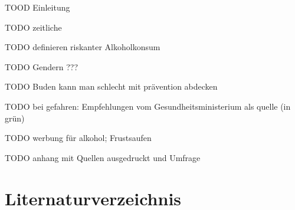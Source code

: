 \documentclass[12pt]{article}
\begin{document}
TOOD Einleitung

TODO zeitliche

TODO definieren riskanter Alkoholkonsum

TODO Gendern ???

TODO Buden kann man schlecht mit prävention abdecken


TODO bei gefahren: Empfehlungen vom Gesundheitsministerium als quelle (in grün)

TODO werbung für alkohol; Frustsaufen


TODO anhang mit Quellen ausgedruckt und Umfrage
\clearpage
\section{Liternaturverzeichnis}
\printbibliography[heading=none]
\end{document}
